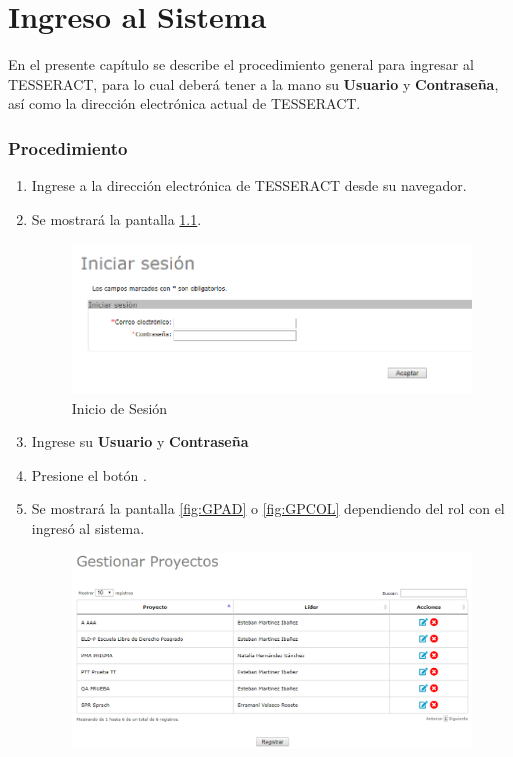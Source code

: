 \chapter{Ingreso al Sistema} \label{chp:IngresoSistema}

	En el presente capítulo se describe el procedimiento general para ingresar al TESSERACT, para lo cual deberá tener a la mano su \textbf{Usuario} y \textbf{Contraseña}, así como la dirección electrónica actual de TESSERACT.

	\subsection{Procedimiento}

		\begin{enumerate}		
			\item Ingrese a la dirección electrónica de TESSERACT desde su navegador.
			\item Se mostrará la pantalla \ref{fig:InicioSesion}.
				\begin{figure}[htbp!]
					\begin{center}
						\includegraphics[scale=0.7]{images/inicioSesion/IU1_IniciarSesion}
						\caption{Inicio de Sesión}
						\label{fig:InicioSesion}
					\end{center}
				\end{figure}
			\item Ingrese su \textbf{Usuario} y \textbf{Contraseña}
			\item Presione el botón \IUAceptar.
			\item Se mostrará la pantalla \ref{fig:GPAD} o \ref{fig:GPCOL} dependiendo del rol con el ingresó al sistema.
				\begin{figure}[htbp!]
					\begin{center}
						\includegraphics[scale=0.5]{images/inicioSesion/IU2GestionProyectos}

\end{center}
\end{figure}
\end{enumerate}
